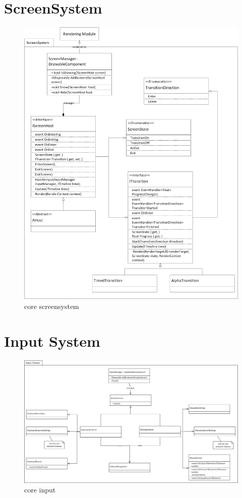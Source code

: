 	\section{ScreenSystem}
	\begin{figure}
		\centering
		\includegraphics[width=160mm]{Images/core_screensystem}
		\caption{core screensystem}
		\label{fig:core_screensystem}
	\end{figure}	
	
	\section{Input System}
	\begin{figure}
		\centering
		\includegraphics[width=160mm]{Images/core_input}
		\caption{core input}
		\label{fig:core_input}
	\end{figure}	